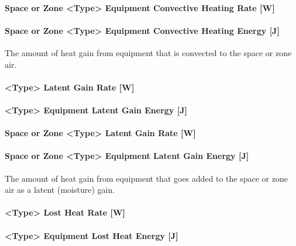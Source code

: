 \paragraph{Space or Zone <Type> Equipment Convective Heating Rate {[}W{]}}\label{zone-equipment-convective-heating-rate-w}

\paragraph{Space or Zone <Type> Equipment Convective Heating Energy {[}J{]}}\label{zone-equipment-convective-heating-energy-j}

The amount of heat gain from equipment that is convected to the space or zone air.

\paragraph{<Type> Latent Gain Rate {[}W{]}}\label{equipment-latent-heating-rate-w}

\paragraph{<Type> Equipment Latent Gain Energy {[}J{]}}\label{equipment-latent-heating-energy-j}

\paragraph{Space or Zone <Type> Latent Gain Rate {[}W{]}}\label{zone-equipment-latent-heating-rate-w}

\paragraph{Space or Zone <Type> Equipment Latent Gain Energy {[}J{]}}\label{zone-equipment-latent-heating-energy-j}

The amount of heat gain from equipment that goes added to the space or zone air as a latent (moisture) gain.

\paragraph{<Type> Lost Heat Rate {[}W{]}}\label{equipment-lost-heating-rate-w}

\paragraph{<Type> Equipment Lost Heat Energy {[}J{]}}\label{equipment-lost-heating-energy-j}

